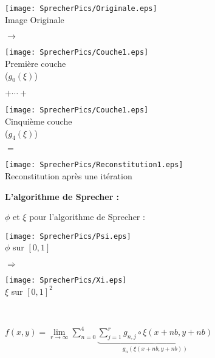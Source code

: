 \documentclass[8pt,a9paper]{beamer} \usepackage[utf8]{inputenc} \usepackage[francais]{babel} \usepackage[T1]{fontenc}
\newcommand{\titp}[1]{\begin{center}\large{\textbf{#1}}\end{center}}
\begin{document}
\begin{frame}
	\begin{center}	\end{center}\begin{center}	\end{center}
	\begin{center}
	\begin{minipage}[c]{2.3cm}\begin{center}\texttt{[image: SprecherPics/Originale.eps]}\\Image Originale\\ \textbf{ } \end{center}\end{minipage}$\rightarrow$
	\begin{minipage}[c]{2.3cm}\begin{center}\texttt{[image: SprecherPics/Couche1.eps]}\\Première couche \\($g_0(\xi)$)\end{center}\end{minipage}$+ \cdots +$
	\begin{minipage}[c]{2.3cm}\begin{center}\texttt{[image: SprecherPics/Couche1.eps]}\\Cinquième couche\\($g_4(\xi)$) \end{center}\end{minipage} $=$
	\begin{minipage}[c]{2.3cm}\begin{center}\texttt{[image: SprecherPics/Reconstitution1.eps]}\\Reconstitution après une itération \end{center}\end{minipage}
	\end{center}
\end{frame}
\begin{frame}
	\titp{L'algorithme de Sprecher :}
	$\phi$ et $\xi$ pour l'algorithme de Sprecher : \hspace{1cm}	
	\begin{minipage}[c]{2.3cm}\begin{center}\texttt{[image: SprecherPics/Psi.eps]}\\$\phi$ sur $[0,1]$ \end{center}\end{minipage} $\Rightarrow$
	\begin{minipage}[c]{2.6cm}\begin{center}\texttt{[image: SprecherPics/Xi.eps]}\\$\xi$ sur $[0,1]^2$ \end{center}\end{minipage}\\
	\begin{center} $\displaystyle f(x, y) = \lim\limits_{r \to \infty} \sum\limits_{n=0}^{4} \underbrace{\sum\limits_{j=1}^{r} g_{n,j} \circ \xi(x+n b, y + n b)}_{g_n\left(\xi(x+n b, y + n b)\right)}$ \end{center}
\end{frame}
\end{document}
